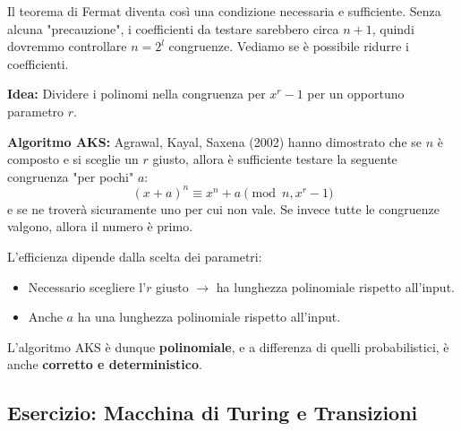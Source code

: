 \vspace{0.4cm}
Il teorema di Fermat diventa così una condizione necessaria e sufficiente. Senza alcuna "precauzione", i coefficienti da testare sarebbero circa $n+1$, quindi dovremmo controllare $n=2^l$ congruenze.
Vediamo se è possibile ridurre i coefficienti. 

\textbf{Idea:} Dividere i polinomi nella congruenza per $x^r - 1$ per un opportuno parametro $r$.

\vspace{0.4cm}
\textbf{Algoritmo AKS:} Agrawal, Kayal, Saxena (2002) hanno dimostrato che se $n$ è composto e si sceglie un $r$ giusto, allora è sufficiente testare la seguente congruenza "per pochi" $a$: 
$$ (x+a)^n \equiv x^n + a \pmod{n, x^r - 1} $$
e se ne troverà sicuramente uno per cui non vale. Se invece tutte le congruenze valgono, allora il numero è primo.

L'efficienza dipende dalla scelta dei parametri:
\begin{itemize}
    \item Necessario scegliere l'$r$ giusto $\to$ ha lunghezza polinomiale rispetto all'input.
    \item Anche $a$ ha una lunghezza polinomiale rispetto all'input.
\end{itemize}
L'algoritmo AKS è dunque \textbf{polinomiale}, e a differenza di quelli probabilistici, è anche \textbf{corretto e deterministico}.

\vspace{0.8cm}

\subsection{Esercizio: Macchina di Turing e Transizioni}


